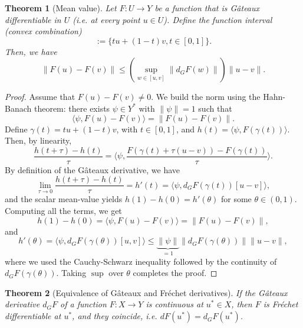 \documentclass{article}
\newtheorem{theorem}{Theorem}
\begin{document}
\begin{theorem}[Mean value]
Let $F:U\to Y$ be a function that is Gâteaux differentiable in $U$ (i.e. at every point $u\in U$). Define the function interval (convex combination)
\begin{equation*}
    [u,v] := \{tu+(1-t)v, t\in[0,1]\}.
\end{equation*}
Then, we have
\begin{equation*}
    \|F(u)-F(v)\| \leq \left(\sup_{w\in[u,v]} \|d_G F(w)\|\right) \|u-v\|. 
\end{equation*}
\end{theorem}
\begin{proof}
    Assume that $F(u)-F(v)\neq 0$. We build the norm using the Hahn-Banach theorem: there exists $\psi \in Y^*$ with $\|\psi\|=1$ such that 
    \begin{equation*}
        \langle \psi, F(u)-F(v)\rangle = \|F(u)-F(v)\|. 
    \end{equation*}    
    Define $\gamma(t) = tu + (1-t)v$, with $t\in [0,1]$, and $h(t)=\langle \psi, F(\gamma(t))\rangle$. Then, by linearity, 
    \begin{equation*}
        \frac{h(t+\tau) - h(t)}{\tau} = \langle \psi, \frac{F(\gamma(t) + \tau(u-v)) - F(\gamma(t))}{\tau} \rangle.
    \end{equation*}
    By definition of the Gâteaux derivative, we have
    \begin{equation*}
        \lim_{\tau\to 0} \frac{h(t+\tau) - h(t)}{\tau} = h'(t) = \langle \psi, d_G F(\gamma(t)) [u-v]\rangle, 
    \end{equation*}
    and the scalar mean-value yields $h(1)-h(0) = h'(\theta)$ for some $\theta\in(0,1)$. Computing all the terms, we get
    \begin{equation*}
        h(1)-h(0) = \langle \psi, F(u)-F(v)\rangle = \|F(u)-F(v)\|,
    \end{equation*}
    and 
    \begin{equation*}
        h'(\theta) = \langle \psi, d_G F(\gamma(\theta))[u,v]\rangle \leq \underbrace{\|\psi\|}_{=1} \|d_G F(\gamma(\theta))\| \|u-v\|,
    \end{equation*}
    where we used the Cauchy-Schwarz inequality followed by the continuity of $d_G F(\gamma(\theta))$. Taking $\sup$ over $\theta$ completes the proof. 
\end{proof}
\begin{theorem}[Equivalence of Gâteaux and Fréchet derivatives]
    If the Gâteaux derivative $d_G F$ of a function $F:X\to Y$ is continuous at $u^*\in X$, then $F$ is Fréchet differentiable at $u^*$, and they coincide, i.e. $dF(u^*) = d_G F(u^*)$.
\end{theorem}
\end{document}
